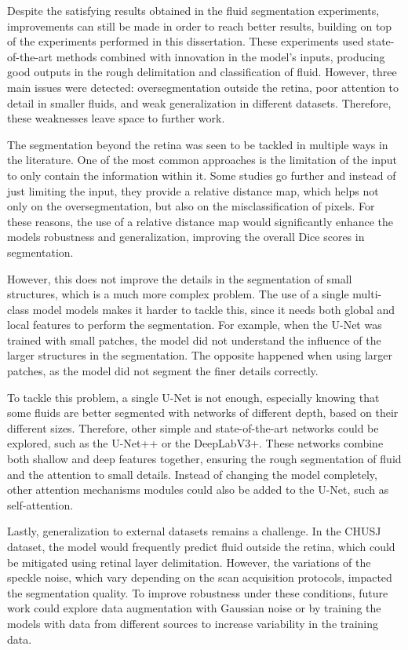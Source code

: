 Despite the satisfying results obtained in the fluid segmentation experiments, improvements can still be made in order to reach better results, building on top of the experiments performed in this dissertation. These experiments used state-of-the-art methods combined with innovation in the model's inputs, producing good outputs in the rough delimitation and classification of fluid. However, three main issues were detected: oversegmentation outside the retina, poor attention to detail in smaller fluids, and weak generalization in different datasets. Therefore, these weaknesses leave space to further work.
\par
The segmentation beyond the retina was seen to be tackled in multiple ways in the literature. One of the most common approaches is the limitation of the input to only contain the information within it. Some studies go further and instead of just limiting the input, they provide a relative distance map, which helps not only on the oversegmentation, but also on the misclassification of pixels. For these reasons, the use of a relative distance map would significantly enhance the models robustness and generalization, improving the overall Dice scores in segmentation.
\par
However, this does not improve the details in the segmentation of small structures, which is a much more complex problem. The use of a single multi-class model models makes it harder to tackle this, since it needs both global and local features to perform the segmentation. For example, when the U-Net was trained with small patches, the model did not understand the influence of the larger structures in the segmentation. The opposite happened when using larger patches, as the model did not segment the finer details correctly.
\par
To tackle this problem, a single U-Net is not enough, especially knowing that some fluids are better segmented with networks of different depth, based on their different sizes. Therefore, other simple and state-of-the-art networks could be explored, such as the U-Net++ or the DeepLabV3+. These networks combine both shallow and deep features together, ensuring the rough segmentation of fluid and the attention to small details. Instead of changing the model completely, other attention mechanisms modules could also be added to the U-Net, such as self-attention.
\par
Lastly, generalization to external datasets remains a challenge. In the CHUSJ dataset, the model would frequently predict fluid outside the retina, which could be mitigated using retinal layer delimitation. However, the variations of the speckle noise, which vary depending on the scan acquisition protocols, impacted the segmentation quality. To improve robustness under these conditions, future work could explore data augmentation with Gaussian noise or by training the models with data from different sources to increase variability in the training data.
